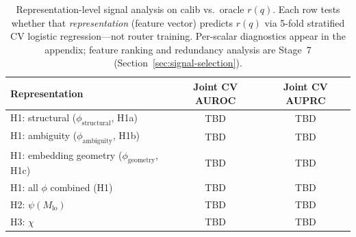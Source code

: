 \begin{table}[t]
  \centering
  \small
  \begin{tabular}{@{}lcc@{}}
    \toprule
    \textbf{Representation} & \textbf{Joint CV AUROC} & \textbf{Joint CV AUPRC} \\
    \midrule
    H1: structural ($\phi_{\text{structural}}$, H1a) & \textsc{TBD} & \textsc{TBD} \\
    H1: ambiguity ($\phi_{\text{ambiguity}}$, H1b) & \textsc{TBD} & \textsc{TBD} \\
    H1: embedding geometry ($\phi_{\text{geometry}}$, H1c) & \textsc{TBD} & \textsc{TBD} \\
    H1: all $\phi$ combined (H1) & \textsc{TBD} & \textsc{TBD} \\
    H2: $\psi(M_{\mathrm{lo}})$ & \textsc{TBD} & \textsc{TBD} \\
    H3: $\chi$ & \textsc{TBD} & \textsc{TBD} \\
  \bottomrule
  \end{tabular}
  \caption{Representation-level signal analysis on calib vs.\ oracle $r(q)$. Each row tests whether that \emph{representation} (feature vector) predicts $r(q)$ via 5-fold stratified CV logistic regression---not router training. Per-scalar diagnostics appear in the appendix; feature ranking and redundancy analysis are Stage~7 (Section~\ref{sec:signal-selection}).}
  \label{tab:signal-analysis}
\end{table}
